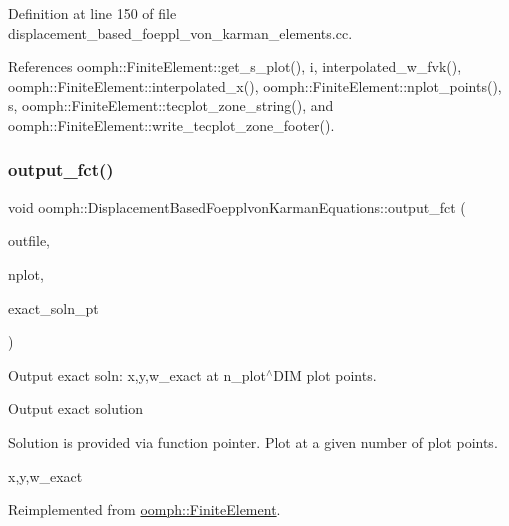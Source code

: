 Definition at line 150 of file displacement\+\_\+based\+\_\+foeppl\+\_\+von\+\_\+karman\+\_\+elements.\+cc.



References oomph\+::\+Finite\+Element\+::get\+\_\+s\+\_\+plot(), i, interpolated\+\_\+w\+\_\+fvk(), oomph\+::\+Finite\+Element\+::interpolated\+\_\+x(), oomph\+::\+Finite\+Element\+::nplot\+\_\+points(), s, oomph\+::\+Finite\+Element\+::tecplot\+\_\+zone\+\_\+string(), and oomph\+::\+Finite\+Element\+::write\+\_\+tecplot\+\_\+zone\+\_\+footer().

\mbox{\label{classoomph_1_1DisplacementBasedFoepplvonKarmanEquations_a43085c764ddc4c1b4676b3e89754f87a}} 
\subsubsection{\texorpdfstring{output\+\_\+fct()}{output\_fct()}\hspace{0.1cm}{\footnotesize\ttfamily [1/2]}}
{\footnotesize\ttfamily void oomph\+::\+Displacement\+Based\+Foepplvon\+Karman\+Equations\+::output\+\_\+fct (\begin{DoxyParamCaption}\item[{std\+::ostream \&}]{outfile,  }\item[{const unsigned \&}]{nplot,  }\item[{\hyperlink{classoomph_1_1FiniteElement_a690fd33af26cc3e84f39bba6d5a85202}{Finite\+Element\+::\+Steady\+Exact\+Solution\+Fct\+Pt}}]{exact\+\_\+soln\+\_\+pt }\end{DoxyParamCaption})\hspace{0.3cm}{\ttfamily [virtual]}}



Output exact soln\+: x,y,w\+\_\+exact at n\+\_\+plot$^\wedge$\+D\+IM plot points. 

Output exact solution

Solution is provided via function pointer. Plot at a given number of plot points.

x,y,w\+\_\+exact 

Reimplemented from \hyperlink{classoomph_1_1FiniteElement_a22b695c714f60ee6cd145be348042035}{oomph\+::\+Finite\+Element}.



